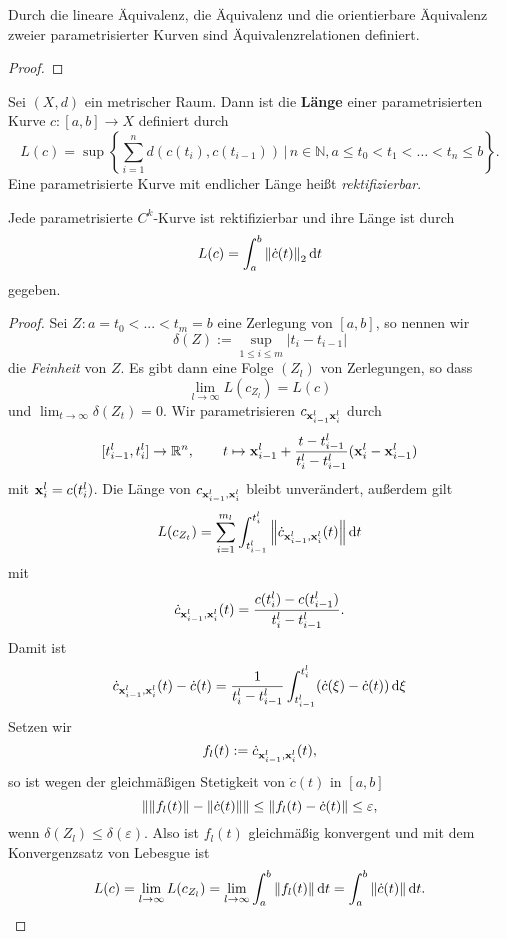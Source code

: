 \documentclass[
pdftex,
oneside,
headsepline,
11pt, 
]{scrreprt}
\begin{document}
\begin{lem}
	Durch die lineare Äquivalenz, die Äquivalenz und die orientierbare Äquivalenz zweier parametrisierter Kurven sind Äquivalenzrelationen definiert.
\end{lem}
\begin{proof}
	
\end{proof}
\begin{de}[Länge]
	Sei $(X,d)$ ein metrischer Raum. Dann ist die \textbf{Länge} einer parametrisierten Kurve $c:[a,b]\to X$ definiert durch
	\[ L(c)=\sup \left\{\sum \limits _{{i=1}}^{n}d(c(t_{i}),
	c(t_{{i-1}}))\,{\Bigg |}\,n\in {\mathbb  {N}},a\leq t_{0}<t_{1}<\ldots <t_{n}\leq b\right\}. \]
	Eine parametrisierte Kurve mit endlicher Länge heißt \textit{rektifizierbar}.
\end{de}
\begin{lem}
	Jede parametrisierte $C^k$-Kurve ist rektifizierbar und ihre Länge ist durch \[ L(c)=\int_a^b\left\lVert\dot{c}(t)\right\rVert_2\mathop{}\!\mathrm{d}{t}\] gegeben.
\end{lem}
\begin{proof}
	Sei $Z:a=t_0<...<t_m=b$ eine Zerlegung von $[a,b]$, so nennen wir \[\delta(Z):=\sup_{1\leq i\leq m}|t_i-t_{i-1}|\] die \textit{Feinheit} von $Z$. Es gibt dann eine Folge $(Z_l)$ von Zerlegungen, so dass \[ \lim_{l\to\infty} L(c_{Z_l})=L(c) \] und $\lim_{t\to \infty}\delta(Z_t)=0.$ Wir parametrisieren $c_{\textnormal{\textbf{x}}^l_{i-1}\textnormal{\textbf{x}}^l_i}$ 
	durch \[[t^l_{i-1},t^l_i]\to \mathbb{R}^n, \qquad t\mapsto \textnormal{\textbf{x}}^l_{i-1} + \frac{t-t^l_{i-1}}{t^l_{i}-t^l_{i-1}}(\textnormal{\textbf{x}}^l_i-\textnormal{\textbf{x}}^l_{i-1})\] mit $\textnormal{\textbf{x}}^l_i=c(t^l_i)$. Die Länge von $c_{\textnormal{\textbf{x}}^l_{i-1},\textnormal{\textbf{x}}^l_i}$ 
	bleibt unverändert, außerdem gilt \[ L(c_{Z_t})=\sum_{i=1}^{m_l}\int_{t^l_{i-1}}^{t^l_i} \left\lVert\dot{c}_{\textnormal{\textbf{x}}^l_{i-1},\textnormal{\textbf{x}}^l_i}(t)\right\rVert \mathop{}\!\mathrm{d} t \] mit \[ \dot{c}_{\textnormal{\textbf{x}}^l_{i-1},\textnormal{\textbf{x}}^l_i}(t)=\frac{c(t^l_i)-c(t^l_{i-1})}{t^l_i-t^l_{i-1}}. \] Damit ist \[  \dot{c}_{\textnormal{\textbf{x}}^l_{i-1},\textnormal{\textbf{x}}^l_i}(t)-\dot{c}(t)=\frac{1}{t^l_i-t^l_{i-1}}\int_{t^l_{i-1}}^{t^l_i}(\dot{c}(\xi)-\dot{c}(t))\mathop{}\!\mathrm{d} \xi \]
	Setzen wir \[ f_l(t):=\dot{c}_{\textnormal{\textbf{x}}^l_{i-1},\textnormal{\textbf{x}}^l_i}(t), \] so ist wegen der gleichmäßigen Stetigkeit von $\dot{c}(t)$ in $[a,b]$ \[ \left\lVert\left\lVert f_l(t)\right\rVert-\left\lVert\dot{c}(t)\right\rVert\right\rVert\leq \left\lVert f_l(t)-\dot{c}(t)\right\rVert\leq \varepsilon, \] wenn $\delta(Z_l)\leq \delta(\varepsilon)$. Also ist $f_l(t)$ gleichmäßig konvergent und mit dem Konvergenzsatz von Lebesgue ist \[L(c)=\lim_{l\to\infty} L(c_{Z_l})=\lim_{l\to\infty}\int_a^b \left\lVert f_l(t)\right\rVert\mathop{}\!\mathrm{d} t=\int_a^b\left\lVert\dot{c}(t)\right\rVert\mathop{}\!\mathrm{d} t.\]
\end{proof}
\end{document}
